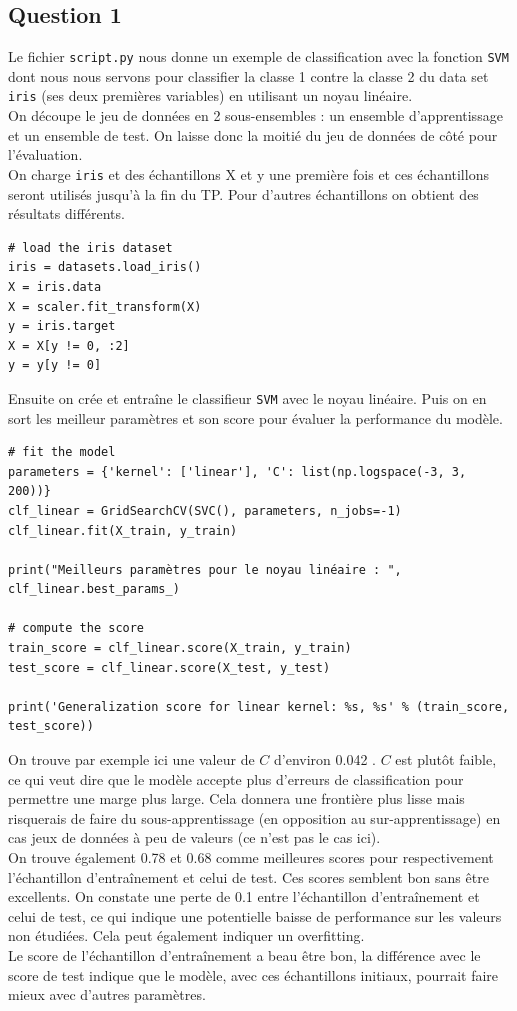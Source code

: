 \documentclass[11pt,a4paper]{article}
\begin{document}
\subsection*{Question 1}
Le fichier \texttt{script.py} nous donne un exemple de classification avec la fonction \texttt{SVM} dont nous nous servons pour classifier la classe 1 contre la classe 2 du data set \texttt{iris} (ses deux premières variables) en utilisant un noyau linéaire.\\
On découpe le jeu de données en 2 sous-ensembles : un ensemble d'apprentissage et un ensemble de test. On laisse donc la moitié du jeu de données de côté pour l'évaluation.\\
On charge \texttt{iris} et des échantillons X et y une première fois et ces échantillons seront utilisés jusqu'à la fin du TP. Pour d'autres échantillons on obtient des résultats différents.
\begin{verbatim}
# load the iris dataset
iris = datasets.load_iris()
X = iris.data
X = scaler.fit_transform(X)
y = iris.target
X = X[y != 0, :2]
y = y[y != 0]
\end{verbatim}
Ensuite on crée et entraîne le classifieur \texttt{SVM} avec le noyau linéaire. Puis on en sort les meilleur paramètres et son score pour évaluer la performance du modèle.
\begin{verbatim}
# fit the model
parameters = {'kernel': ['linear'], 'C': list(np.logspace(-3, 3, 200))}
clf_linear = GridSearchCV(SVC(), parameters, n_jobs=-1)
clf_linear.fit(X_train, y_train)

print("Meilleurs paramètres pour le noyau linéaire : ", clf_linear.best_params_)

# compute the score
train_score = clf_linear.score(X_train, y_train)
test_score = clf_linear.score(X_test, y_test)

print('Generalization score for linear kernel: %s, %s' % (train_score, test_score))
\end{verbatim}
On trouve par exemple ici une valeur de $C$ d'environ 0.042 . $C$ est plutôt faible, ce qui veut dire que le modèle accepte plus d'erreurs de classification pour permettre une marge plus large. Cela donnera une frontière plus lisse mais risquerais de faire du sous-apprentissage (en opposition au sur-apprentissage) en cas jeux de données à peu de valeurs (ce n'est pas le cas ici).\\
On trouve également 0.78 et 0.68 comme meilleures scores pour respectivement l'échantillon d'entraînement et celui de test. Ces scores semblent bon sans être excellents. On constate une perte de 0.1 entre l'échantillon d'entraînement et celui de test, ce qui indique une potentielle baisse de performance sur les valeurs non étudiées. Cela peut également indiquer un overfitting.\\
Le score de l'échantillon d'entraînement a beau être bon, la différence avec le score de test indique que le modèle, avec ces échantillons initiaux, pourrait faire mieux avec d'autres paramètres. 
\end{document}
